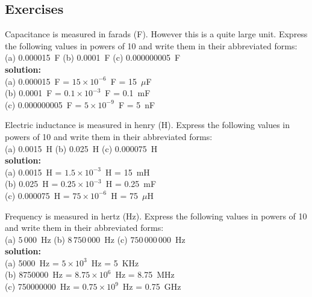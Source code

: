 \subsection*{Exercises}
\begin{exercise}
  Capacitance is measured in farads (F). However this is a quite large unit. Express the following values in powers of 10 and write them in their abbreviated forms:\\
  (a) 0.000015~F
  (b) 0.0001~F
  (c) 0.000000005~F\\

\textbf{solution:}\\

(a) 0.000015~F = $15 \times 10^{-6}$~F = 15~$\mu$F\\
(b) 0.0001~F = $0.1 \times 10^{-3}$~F = 0.1~mF\\
(c) 0.000000005~F = $5 \times 10^{-9}$~F = 5~nF\\
\end{exercise}

\begin{exercise}
  Electric inductance is measured in henry (H). Express the following values in powers of 10 and write them in their abbreviated forms:\\
  (a) 0.0015~H
  (b) 0.025~H
  (c) 0.000075~H\\

\textbf{solution:}\\

(a) 0.0015~H = $1.5 \times 10^{-3}$~H = 15~mH\\
(b) 0.025~H =  $0.25 \times 10^{-3}$~H = 0.25~mF\\
(c) 0.000075~H = $75 \times 10^{-6}$~H = 75~$\mu$H\\
\end{exercise}

\begin{exercise}
  Frequency is measured in hertz (Hz). Express the following values in powers of 10 and write them in their abbreviated forms:\\
  (a) $5\,000$~Hz
  (b) $8\,750\,000$~Hz
  (c) $750\,000\,000$~Hz\\

\textbf{solution:}\\

(a) 5000~Hz = $5 \times 10^{3}$~Hz = 5~KHz\\
(b) 8750000~Hz =  $8.75 \times 10^{6}$~Hz = 8.75~MHz\\
(c) 750000000~Hz = $0.75 \times 10^{9}$~Hz = 0.75~GHz\\
\end{exercise}

